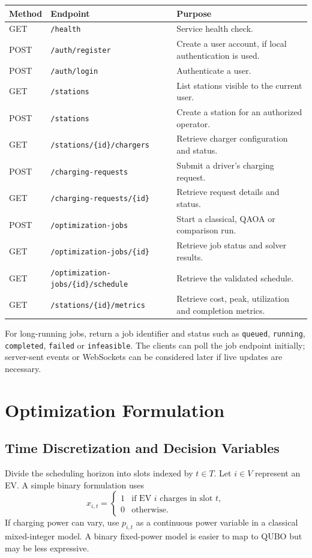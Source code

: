 \documentclass[11pt,a4paper]{article}
\begin{document}
\begin{longtable}{p{1.4cm}p{5.1cm}p{6.4cm}}
\toprule
\textbf{Method} & \textbf{Endpoint} & \textbf{Purpose} \\
\midrule
GET & \texttt{/health} & Service health check. \\
POST & \texttt{/auth/register} & Create a user account, if local authentication is used. \\
POST & \texttt{/auth/login} & Authenticate a user. \\
GET & \texttt{/stations} & List stations visible to the current user. \\
POST & \texttt{/stations} & Create a station for an authorized operator. \\
GET & \texttt{/stations/\{id\}/chargers} & Retrieve charger configuration and status. \\
POST & \texttt{/charging-requests} & Submit a driver's charging request. \\
GET & \texttt{/charging-requests/\{id\}} & Retrieve request details and status. \\
POST & \texttt{/optimization-jobs} & Start a classical, QAOA or comparison run. \\
GET & \texttt{/optimization-jobs/\{id\}} & Retrieve job status and solver results. \\
GET & \texttt{/optimization-jobs/\{id\}/schedule} & Retrieve the validated schedule. \\
GET & \texttt{/stations/\{id\}/metrics} & Retrieve cost, peak, utilization and completion metrics. \\
\bottomrule
\end{longtable}

For long-running jobs, return a job identifier and status such as \texttt{queued}, \texttt{running}, \texttt{completed}, \texttt{failed} or \texttt{infeasible}. The clients can poll the job endpoint initially; server-sent events or WebSockets can be considered later if live updates are necessary.

\section{Optimization Formulation}

\subsection{Time Discretization and Decision Variables}

Divide the scheduling horizon into slots indexed by \(t \in T\). Let \(i \in V\) represent an EV. A simple binary formulation uses
\[
x_{i,t} =
\begin{cases}
1 & \text{if EV } i \text{ charges in slot } t,\\
0 & \text{otherwise.}
\end{cases}
\]
If charging power can vary, use \(p_{i,t}\) as a continuous power variable in a classical mixed-integer model. A binary fixed-power model is easier to map to QUBO but may be less expressive.
\end{document}
